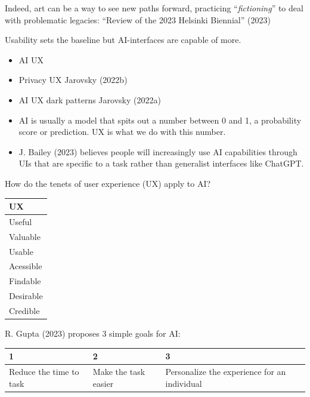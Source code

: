 \documentclass[
  letterpaper,
  DIV=11,
  numbers=noendperiod]{scrartcl}
\begin{document}
Indeed, art can be a way to see new paths forward, practicing
``\emph{fictioning}'' to deal with problematic legacies: {``Review of
the 2023 {Helsinki Biennial}''} (2023)

Usability sets the baseline but AI-interfaces are capable of more.

\begin{itemize}
\item
  AI UX
\item
  Privacy UX Jarovsky (2022b)
\item
  AI UX dark patterns Jarovsky (2022a)
\item
  AI is usually a model that spits out a number between 0 and 1, a
  probability score or prediction. UX is what we do with this number.
\item
  J. Bailey (2023) believes people will increasingly use AI capabilities
  through UIs that are specific to a task rather than generalist
  interfaces like ChatGPT.
\end{itemize}

How do the tenets of user experience (UX) apply to AI?

\begin{longtable}[]{@{}l@{}}
\toprule\noalign{}
UX \\
\midrule\noalign{}
\endhead
\bottomrule\noalign{}
\endlastfoot
Useful \\
Valuable \\
Usable \\
Acessible \\
Findable \\
Desirable \\
Credible \\
\end{longtable}

R. Gupta (2023) proposes 3 simple goals for AI:

\begin{longtable}[]{@{}
  >{\raggedright\arraybackslash}p{}
  >{\raggedright\arraybackslash}p{}
  >{\raggedright\arraybackslash}p{}@{}}
\toprule\noalign{}
\begin{minipage}[b]{\linewidth}\raggedright
1
\end{minipage} & \begin{minipage}[b]{\linewidth}\raggedright
2
\end{minipage} & \begin{minipage}[b]{\linewidth}\raggedright
3
\end{minipage} \\
\midrule\noalign{}
\endhead
\bottomrule\noalign{}
\endlastfoot
Reduce the time to task & Make the task easier & Personalize the
experience for an individual \\
\end{longtable}
\end{document}
